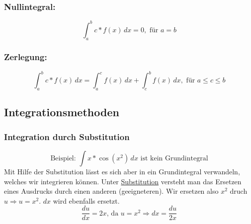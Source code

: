\documentclass[11pt]{amsart}
\theoremstyle{remark}
\begin{document}
\subsubsection{Nullintegral:}
\begin{equation*}
	\int_a^b c*f(x)\,dx = 0, \text{ f\"ur } a=b
\end{equation*}
\subsubsection{Zerlegung:}
\begin{equation*}
	\int_a^b c*f(x)\,dx = \int_a^c f(x) \,dx + \int_c^b f(x) \,dx, \text{ f\"ur } a \leq c\leq b
\end{equation*}

\subsection{Integrationsmethoden}
\subsubsection{Integration durch Substitution}
\begin{equation*}
	\text{Beispiel: } \int x*\cos(x^2)\,dx \text{ ist kein Grundintegral}
\end{equation*}
Mit Hilfe der Substitution l\"asst es sich aber in ein Grundintegral verwandeln, welches wir integrieren k\"onnen.\newline
Unter \underline{Substitution} versteht man das Ersetzen eines Ausdrucks durch einen anderen (geeigneteren).\newline
Wir ersetzen also $x^2$ druch $u \Rightarrow u=x^2$.\newline
$dx$ wird ebenfalls ersetzt.
\begin{equation*}
	\frac {du}{dx} = 2x \text{, da } u=x^2 \Rightarrow dx = \frac {du}{2x}
\end{equation*}
\end{document}
